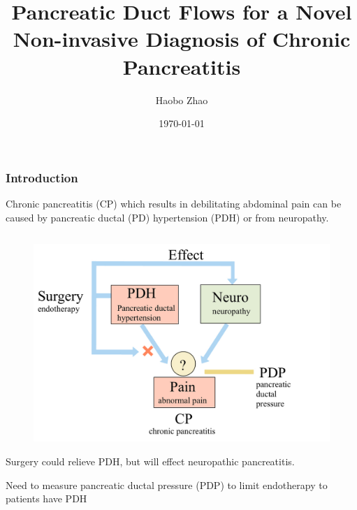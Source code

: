 \documentclass{beamer}
\title{Pancreatic Duct Flows for a Novel Non-invasive Diagnosis of Chronic Pancreatitis }
\author{Haobo Zhao}
\date{\today}
\begin{document}
\frame{\titlepage}







\begin{frame}
    \fontsize{8pt}{10pt}\selectfont
    \frametitle{ Introduction }

    Chronic pancreatitis (CP) which results in  
    debilitating abdominal pain can be caused 
    by pancreatic ductal (PD) hypertension (PDH) 
    or  from  neuropathy. 

    \begin{columns}
        \begin{column}{0.4\textwidth}

            \begin{figure}[H]
                \centering
                \includegraphics[width=1.2\textwidth]{figures/Introduction.jpg}
            \end{figure}

                        
            Surgery could relieve PDH, but will
            effect neuropathic pancreatitis.

            \vspace{0.02\textwidth}

            Need to measure 
            pancreatic ductal pressure (PDP)
            to limit endotherapy to patients 
            have PDH

        \end{column}

        \hspace{0.05\textwidth}



\end{columns}
\end{frame}
\end{document}

